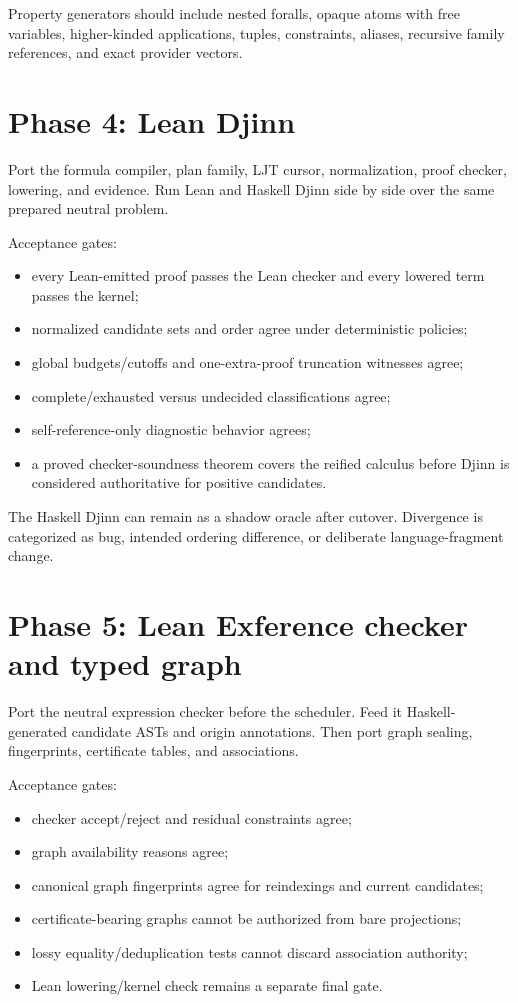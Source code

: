 \documentclass[10pt,letterpaper,oneside]{report}
\begin{document}
Property generators should include nested foralls, opaque atoms with free variables, higher-kinded applications, tuples, constraints, aliases, recursive family references, and exact provider vectors.

\section{Phase 4: Lean Djinn}

Port the formula compiler, plan family, LJT cursor, normalization, proof checker, lowering, and evidence. Run Lean and Haskell Djinn side by side over the same prepared neutral problem.

Acceptance gates:

\begin{itemize}
  \item every Lean-emitted proof passes the Lean checker and every lowered term passes the kernel;
  \item normalized candidate sets and order agree under deterministic policies;
  \item global budgets/cutoffs and one-extra-proof truncation witnesses agree;
  \item complete/exhausted versus undecided classifications agree;
  \item self-reference-only diagnostic behavior agrees;
  \item a proved checker-soundness theorem covers the reified calculus before Djinn is considered authoritative for positive candidates.
\end{itemize}

The Haskell Djinn can remain as a shadow oracle after cutover. Divergence is categorized as bug, intended ordering difference, or deliberate language-fragment change.

\section{Phase 5: Lean Exference checker and typed graph}

Port the neutral expression checker before the scheduler. Feed it Haskell-generated candidate ASTs and origin annotations. Then port graph sealing, fingerprints, certificate tables, and associations.

Acceptance gates:

\begin{itemize}
  \item checker accept/reject and residual constraints agree;
  \item graph availability reasons agree;
  \item canonical graph fingerprints agree for reindexings and current candidates;
  \item certificate-bearing graphs cannot be authorized from bare projections;
  \item lossy equality/deduplication tests cannot discard association authority;
  \item Lean lowering/kernel check remains a separate final gate.
\end{itemize}
\end{document}
